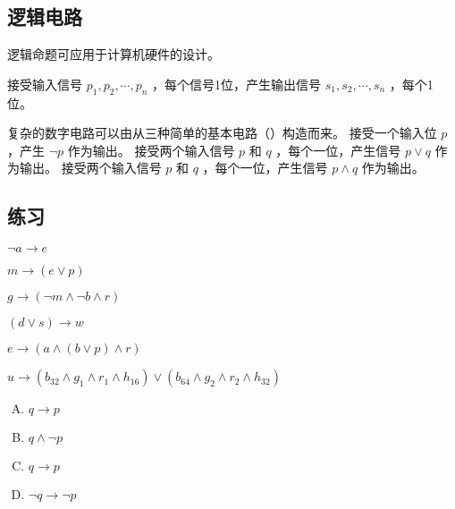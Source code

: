 {    \subsection{逻辑电路}
    {
        逻辑命题可应用于计算机硬件的设计。

        接受输入信号 $p_1, p_2, \cdots, p_n$ ，每个信号1位，产生输出信号 $s_1, s_2, \cdots, s_n$ ，每个1位。

        复杂的数字电路可以由从三种简单的基本电路（）构造而来。
        接受一个输入位 $p$ ，产生 $\neg p$ 作为输出。
        接受两个输入信号 $p$ 和 $q$ ，每个一位，产生信号 $p \vee q$ 作为输出。
        接受两个输入信号 $p$ 和 $q$ ，每个一位，产生信号 $p \wedge q$ 作为输出。
    }

    \subsection{练习}
    {
        \begin{practices}
            $\neg a \rightarrow e$
        \end{practices}

        \begin{practices}
            $m \rightarrow (e \vee p)$
        \end{practices}

        \begin{practices}
            $g \rightarrow (\neg m \wedge \neg b \wedge r)$
        \end{practices}

        \begin{practices}
            $(d \vee s) \rightarrow w$
        \end{practices}

        \begin{practices}
            $e \rightarrow (a \wedge (b \vee p) \wedge r)$
        \end{practices}

        \begin{practices}
            $u \rightarrow (b_{32} \wedge g_{1} \wedge r_{1} \wedge h_{16}) \vee (b_{64} \wedge g_{2} \wedge r_{2} \wedge h_{32})$
        \end{practices}

        \begin{practices}
            \begin{enumerate}[A.]
                \item $q \rightarrow p$
                \item $q \wedge \neg p$
                \item $q \rightarrow p$
                \item $\neg q \rightarrow \neg p$
            \end{enumerate}
        \end{practices}

}}
